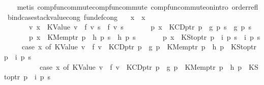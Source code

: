 \begin{isabellebody}
\ \ \isamarkupfalse%
\ {\isacharparenleft}{\kern0pt}metis\ comp{\isacharunderscore}{\kern0pt}fun{\isacharunderscore}{\kern0pt}commute{\isachardot}{\kern0pt}comp{\isacharunderscore}{\kern0pt}fun{\isacharunderscore}{\kern0pt}commute\ comp{\isacharunderscore}{\kern0pt}fun{\isacharunderscore}{\kern0pt}commute{\isacharunderscore}{\kern0pt}on{\isachardot}{\kern0pt}intro\ order{\isacharunderscore}{\kern0pt}refl{\isacharparenright}{\kern0pt}%
\endisatagproof
{\isafoldproof}%
%
\isadelimproof
\isanewline
%
\endisadelimproof
\isanewline
{}\isamarkupfalse%
\ bind{\isacharunderscore}{\kern0pt}case{\isacharunderscore}{\kern0pt}stackvalue{\isacharunderscore}{\kern0pt}cong\ {\isacharbrackleft}{\kern0pt}fundef{\isacharunderscore}{\kern0pt}cong{\isacharbrackright}{\kern0pt}{\isacharcolon}{\kern0pt}\isanewline
\ \ \ {\isachardoublequoteopen}x\ {\isacharequal}{\kern0pt}\ x{\isacharprime}{\kern0pt}{\isachardoublequoteclose}\isanewline
\ \ \ \ \ \ \ {\isachardoublequoteopen}{\isasymAnd}v{\isachardot}{\kern0pt}\ x\ {\isacharequal}{\kern0pt}\ KValue\ v\ {\isasymLongrightarrow}\ f\ v\ s\ {\isacharequal}{\kern0pt}\ f{\isacharprime}{\kern0pt}\ v\ s{\isachardoublequoteclose}\isanewline
\ \ \ \ \ \ \ {\isachardoublequoteopen}{\isasymAnd}p{\isachardot}{\kern0pt}\ x\ {\isacharequal}{\kern0pt}\ KCDptr\ p\ {\isasymLongrightarrow}\ g\ p\ s\ {\isacharequal}{\kern0pt}\ g{\isacharprime}{\kern0pt}\ p\ s{\isachardoublequoteclose}\isanewline
\ \ \ \ \ \ \ {\isachardoublequoteopen}{\isasymAnd}p{\isachardot}{\kern0pt}\ x\ {\isacharequal}{\kern0pt}\ KMemptr\ p\ {\isasymLongrightarrow}\ h\ p\ s\ {\isacharequal}{\kern0pt}\ h{\isacharprime}{\kern0pt}\ p\ s{\isachardoublequoteclose}\isanewline
\ \ \ \ \ \ \ {\isachardoublequoteopen}{\isasymAnd}p{\isachardot}{\kern0pt}\ x\ {\isacharequal}{\kern0pt}\ KStoptr\ p\ {\isasymLongrightarrow}\ i\ p\ s\ {\isacharequal}{\kern0pt}\ i{\isacharprime}{\kern0pt}\ p\ s{\isachardoublequoteclose}\isanewline
\ \ \ \ \ {\isachardoublequoteopen}{\isacharparenleft}{\kern0pt}case\ x\ of\ KValue\ v\ {\isasymRightarrow}\ f\ v\ {\isacharbar}{\kern0pt}\ KCDptr\ p\ {\isasymRightarrow}\ g\ p\ {\isacharbar}{\kern0pt}\ KMemptr\ p\ {\isasymRightarrow}\ h\ p\ {\isacharbar}{\kern0pt}\ KStoptr\ p\ {\isasymRightarrow}\ i\ p{\isacharparenright}{\kern0pt}\ s\isanewline
\ \ \ \ \ \ \ \ \ {\isacharequal}{\kern0pt}\ {\isacharparenleft}{\kern0pt}case\ x{\isacharprime}{\kern0pt}\ of\ KValue\ v\ {\isasymRightarrow}\ f{\isacharprime}{\kern0pt}\ v\ {\isacharbar}{\kern0pt}\ KCDptr\ p\ {\isasymRightarrow}\ g{\isacharprime}{\kern0pt}\ p\ {\isacharbar}{\kern0pt}\ KMemptr\ p\ {\isasymRightarrow}\ h{\isacharprime}{\kern0pt}\ p\ {\isacharbar}{\kern0pt}\ KStoptr\ p\ {\isasymRightarrow}\ i{\isacharprime}{\kern0pt}\ p{\isacharparenright}{\kern0pt}\ s{\isachardoublequoteclose}\isanewline

\end{isabellebody}
